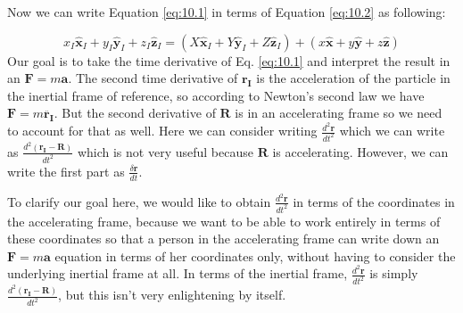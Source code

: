 \documentclass[11pt, draft]{article}
\begin{document}
Now we can write Equation \ref{eq:10.1} in terms of Equation \ref{eq:10.2} as following:

\begin{equation}
	x_I \hat{\mathbf{x}}_I + y_I \hat{\mathbf{y}}_I + z_I \hat{\mathbf{z}}_I = (X \hat{\mathbf{x}}_I + Y \hat{\mathbf{y}}_I + Z \hat{\mathbf{z}}_I) + (x \hat{\mathbf{x}} + y \hat{\mathbf{y}} + z \hat{\mathbf{z}})
	\label{eq:10.3}
\end{equation}
Our goal is to take the time derivative of Eq. \ref{eq:10.1} and interpret the result in an \(\mathbf{F} = m\mathbf{a}\). The second time derivative of \(\mathbf{r_I}\) is the acceleration of the particle in the inertial frame of reference, so according to Newton's second law we have \(\mathbf{F} = m\ddot{\mathbf{r_I}}\). But the second derivative of \(\mathbf{R}\) is in an accelerating frame so we need to account for that as well. Here we can consider writing \(\frac{d^2\mathbf{r}}{dt^2}\) which we can write as \(\frac{d^2\left(\mathbf{r_I} - \mathbf{R}\right)}{dt^2}\) which is not very useful because \(\mathbf{R}\) is accelerating. However, we can write the first part as \(\frac{\delta\mathbf{r}}{dt}\).

To clarify our goal here, we would like to obtain \(\frac{d^2\mathbf{r}}{dt^2}\) in terms of the coordinates in the accelerating frame, because we want to be able to work entirely in terms of these coordinates so that a person in the accelerating frame can write down an \(\mathbf{F} = m\mathbf{a}\) equation in terms of her coordinates only, without having to consider the underlying inertial frame at all. In terms of the inertial frame, \(\frac{d^2\mathbf{r}}{dt^2}\) is simply \(\frac{d^2(\mathbf{r_I} - \mathbf{R})}{dt^2}\), but this isn’t very enlightening by itself.
\end{document}
